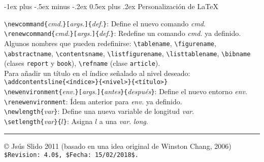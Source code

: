 \documentclass[10pt,landscape,a4paper]{article}
\makeatletter
\renewcommand{\section}{\@startsection{section}{1}{0mm}%
                                {-1ex plus -.5ex minus -.2ex}%
                                {0.5ex plus .2ex}%
                                {\normalfont\large\bfseries}}
\makeatother
\begin{document}
\begin{multicols}{3}
\section{Personalización de \LaTeX}

\verb!\newcommand{!\emph{cmd.}\verb!}[!\emph{args.}\verb!]{!\emph{def.}\verb!}!: Define el nuevo comando \emph{cmd}.\\
\verb!\renewcommand{!\emph{cmd.}\verb!}[!\emph{args.}\verb!]{!\emph{def.}\verb!}!: Redefine un comando \emph{cmd.} ya definido.\\[0.7mm]

 Algunos nombres que pueden redefinirse: \verb!\tablename!, \verb!\figurename!, \verb!\abstractname!, \verb!\contentsname!, \verb!\listfigurename!, \verb!\listtablename!, \verb!\bibname! (clases \texttt{report} y \texttt{book}), \verb!\refname! (clase \texttt{article}).\\
 Para añadir un título en el índice señalado al nivel deseado:\\
\verb|\addcontentsline{<índice>}{<nivel>}{<título>}|\\[0.7mm]
 
\verb!\newenvironment{!\emph{env.}\verb!}[!\emph{args.}\verb!]{!\emph{antes}\verb!}{!\emph{después}\verb!}!: Define el nuevo entorno \emph{env}.\\
\verb!\renewenvironment!: Ídem anterior para \emph{env.} ya definido.\\
\verb!\newlength{!\emph{var}\verb!}!: Define una nueva variable de longitud \emph{var}.\\
\verb!\setlength{!\emph{var}\verb!}{!$l$\verb!}!: Asigna $l$ a una \emph{var}. \emph{long}. \\[0.7mm]
 

\rule{0.3\linewidth}{0.25pt}
\scriptsize

\copyright{}  Jsús Slido 2011 (basado en una idea original de Winston Chang, 2006)\\
\verb!$Revision: 4.0$, $Fecha: 15/02/2018$.!

\end{multicols}
\end{document}
